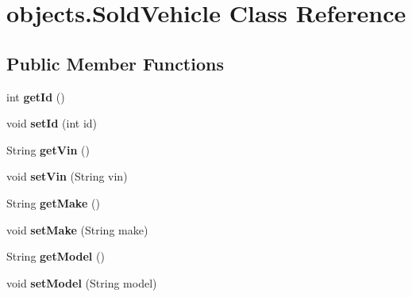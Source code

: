 \hypertarget{classobjects_1_1_sold_vehicle}{}\section{objects.\+Sold\+Vehicle Class Reference}
\label{classobjects_1_1_sold_vehicle}
\subsection*{Public Member Functions}
\begin{DoxyCompactItemize}
\item 
\mbox{\label{classobjects_1_1_sold_vehicle_a7175126fa8181fde71d292c65b12fdc4}} 
int {\bfseries get\+Id} ()
\item 
\mbox{\label{classobjects_1_1_sold_vehicle_a0b5e148ace0a20022013a5f0e4133197}} 
void {\bfseries set\+Id} (int id)
\item 
\mbox{\label{classobjects_1_1_sold_vehicle_ac42392e863e11b69f3cb74c8d88d342e}} 
String {\bfseries get\+Vin} ()
\item 
\mbox{\label{classobjects_1_1_sold_vehicle_a77166ab83f45466df63a079d62cda4ba}} 
void {\bfseries set\+Vin} (String vin)
\item 
\mbox{\label{classobjects_1_1_sold_vehicle_ad68fc5f0ad36e424886f7805e091cb57}} 
String {\bfseries get\+Make} ()
\item 
\mbox{\label{classobjects_1_1_sold_vehicle_a0a0bd5ae106e5ed72b3e9a2313bd1265}} 
void {\bfseries set\+Make} (String make)
\item 
\mbox{\label{classobjects_1_1_sold_vehicle_a135592b4c8108ef3db13ffad174be08a}} 
String {\bfseries get\+Model} ()
\item 
\mbox{\label{classobjects_1_1_sold_vehicle_ad52565360f592ca2df0d4fdf8581f86d}} 
void {\bfseries set\+Model} (String model)
\item 
\mbox{\label{classobjects_1_1_sold_vehicle_ae9dc4b7d4c26a82f2de47373b8bb345c}} 

\end{DoxyCompactItemize}
